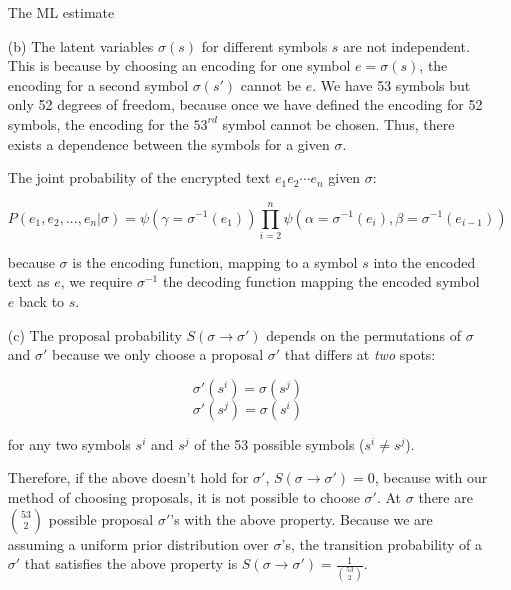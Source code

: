 \documentclass[12pt]{article}
\begin{document}
\begin{enumerate}
The ML estimate








\item[(b)] The latent variables $\sigma(s)$ for different symbols $s$ are not independent.
This is because by choosing an encoding for one symbol $e = \sigma(s)$, the encoding for a second symbol $\sigma(s')$ cannot be $e$.
We have 53 symbols but only 52 degrees of freedom, because once we have defined the encoding for 52 symbols, the encoding for the $53^{rd}$ symbol cannot be chosen.
Thus, there exists a dependence between the symbols for a given $\sigma$.

The joint probability of the encrypted text $e_1 e_2 \cdots e_n$ given $\sigma$:

$$P(e_1, e_2,...,e_n|\sigma) = \psi(\gamma=\sigma^{-1}(e_1))\prod_{i=2}^n \psi(\alpha=\sigma^{-1}(e_i), \beta=\sigma^{-1}(e_{i-1}))$$

because $\sigma$ is the encoding function, mapping to a symbol $s$ into the encoded text as $e$, we require $\sigma^{-1}$ the decoding function mapping the encoded symbol $e$ back to $s$.

\item[(c)] The proposal probability $S(\sigma \rightarrow \sigma')$ depends on the permutations of $\sigma$ and $\sigma'$ because we only choose a proposal $\sigma'$ that differs at \textit{two} spots:

$$\sigma'(s^i) = \sigma(s^j)$$
$$\sigma'(s^j) = \sigma(s^i)$$

for any two symbols $s^i$ and $s^j$ of the 53 possible symbols ($s^i \neq s^j$).

Therefore, if the above doesn't hold for $\sigma'$, $S(\sigma \rightarrow \sigma')=0$, because with our method of choosing proposals, it is not possible to choose $\sigma'$.
At $\sigma$ there are ${53 \choose 2}$ possible proposal $\sigma'$'s with the above property.
Because we are assuming a uniform prior distribution over $\sigma$'s, the transition probability of a $\sigma'$ that satisfies the above property is $S(\sigma \rightarrow \sigma')=\frac{1}{{53 \choose 2}}$.


\end{enumerate}
\end{document}
